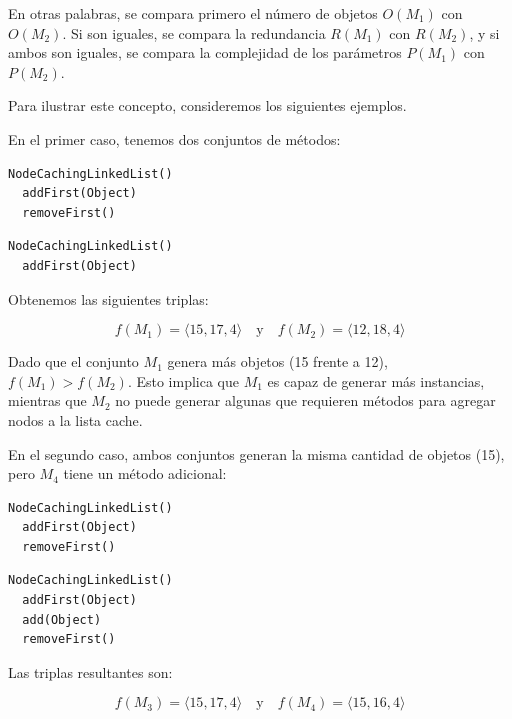En otras palabras, se compara primero el número de objetos \( O(M_1) \) con \( O(M_2) \). 
Si son iguales, se compara la redundancia \( R(M_1) \) con \( R(M_2) \), y si ambos son iguales, 
se compara la complejidad de los parámetros \( P(M_1) \) con \( P(M_2) \).

Para ilustrar este concepto, consideremos los siguientes ejemplos.

En el primer caso, tenemos dos conjuntos de métodos:
\vspace{5pt} 

\begin{lstlisting}[numbers=none, caption=Conjunto de métodos \( M_1 \)]
  NodeCachingLinkedList()
  addFirst(Object)
  removeFirst()
\end{lstlisting} 


\begin{lstlisting}[numbers=none, caption=Conjunto de métodos \( M_2 \)]
  NodeCachingLinkedList()
  addFirst(Object)
\end{lstlisting}


Obtenemos las siguientes triplas:

\[
f(M_1) = \langle 15, 17, 4 \rangle \quad \text{y} \quad f(M_2) = \langle 12, 18, 4 \rangle
\]

Dado que el conjunto \( M_1 \) genera más objetos (15 frente a 12), \( f(M_1) > f(M_2) \). Esto implica que \( M_1 \) es capaz de generar más instancias, mientras que \( M_2 \) no puede generar algunas que requieren métodos para agregar nodos a la lista cache.

En el segundo caso, ambos conjuntos generan la misma cantidad de objetos (15), pero \( M_4 \) tiene un método adicional:
\vspace{10pt} 

\begin{lstlisting}[numbers=none,label=fig:NCLbuilders3, caption=Conjunto de métodos \( M_3 \)]
  NodeCachingLinkedList()
  addFirst(Object)
  removeFirst()
\end{lstlisting}

\vspace{10pt} 

\begin{lstlisting}[numbers=none,label=fig:NCLbuilders4, caption=Conjunto de métodos \( M_4 \)]
  NodeCachingLinkedList()
  addFirst(Object)
  add(Object)
  removeFirst()
\end{lstlisting}


Las triplas resultantes son:

\[
f(M_3) = \langle 15, 17, 4 \rangle \quad \text{y} \quad f(M_4) = \langle 15, 16, 4 \rangle
\]

